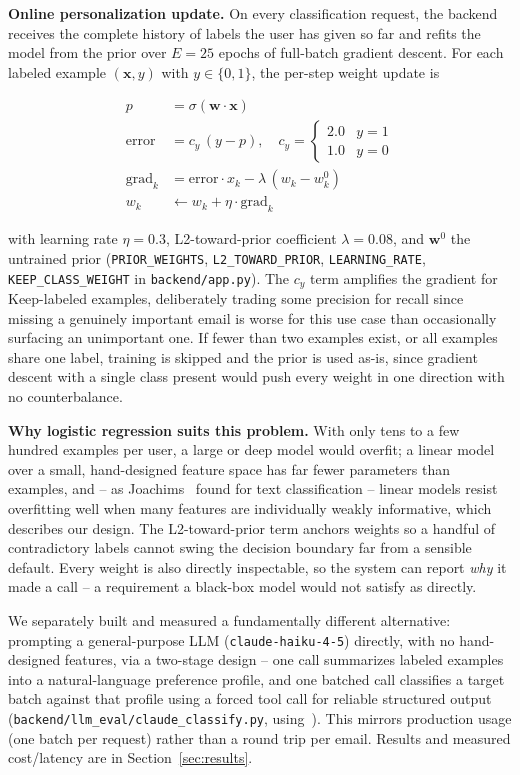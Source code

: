 \documentclass[twoside,twocolumn,10pt]{article}
\begin{document}
\textbf{Online personalization update.} On every classification request, the backend receives the complete history of labels the user has given so far and refits the model from the prior over $E=25$ epochs of full-batch gradient descent. For each labeled example $(\mathbf{x}, y)$ with $y \in \{0,1\}$, the per-step weight update is

\begin{align}
p &= \sigma(\mathbf{w}\cdot\mathbf{x}) \\
\text{error} &= c_y\,(y - p), \quad c_y = \begin{cases} 2.0 & y=1 \\ 1.0 & y=0 \end{cases} \\
\text{grad}_k &= \text{error}\cdot x_k - \lambda\,(w_k - w^0_k) \\
w_k &\leftarrow w_k + \eta \cdot \text{grad}_k
\end{align}

with learning rate $\eta = 0.3$, L2-toward-prior coefficient $\lambda = 0.08$, and $\mathbf{w}^0$ the untrained prior (\texttt{PRIOR\_WEIGHTS}, \texttt{L2\_TOWARD\_PRIOR}, \texttt{LEARNING\_RATE}, \texttt{KEEP\_CLASS\_WEIGHT} in \texttt{backend/app.py}). The $c_y$ term amplifies the gradient for Keep-labeled examples, deliberately trading some precision for recall since missing a genuinely important email is worse for this use case than occasionally surfacing an unimportant one. If fewer than two examples exist, or all examples share one label, training is skipped and the prior is used as-is, since gradient descent with a single class present would push every weight in one direction with no counterbalance.

\textbf{Why logistic regression suits this problem.} With only tens to a few hundred examples per user, a large or deep model would overfit; a linear model over a small, hand-designed feature space has far fewer parameters than examples, and -- as Joachims~\cite{joachims1998text} found for text classification -- linear models resist overfitting well when many features are individually weakly informative, which describes our design. The L2-toward-prior term anchors weights so a handful of contradictory labels cannot swing the decision boundary far from a sensible default. Every weight is also directly inspectable, so the system can report \emph{why} it made a call -- a requirement a black-box model would not satisfy as directly.

We separately built and measured a fundamentally different alternative: prompting a general-purpose LLM (\texttt{claude-haiku-4-5}) directly, with no hand-designed features, via a two-stage design -- one call summarizes labeled examples into a natural-language preference profile, and one batched call classifies a target batch against that profile using a forced tool call for reliable structured output (\texttt{backend/llm\_eval/claude\_classify.py}, using~\cite{anthropic_docs}). This mirrors production usage (one batch per request) rather than a round trip per email. Results and measured cost/latency are in Section~\ref{sec:results}.
\end{document}
